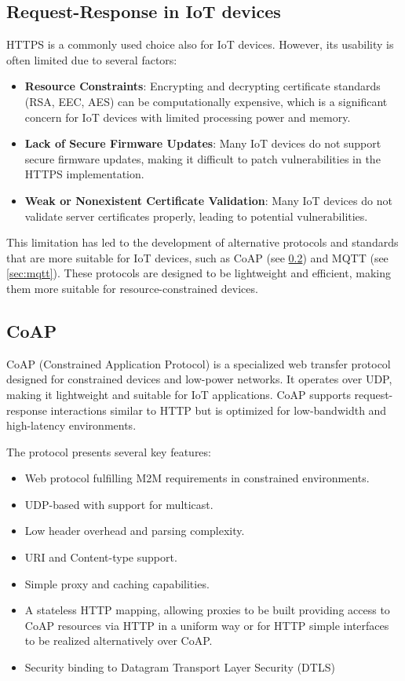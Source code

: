 \subsection{Request-Response in IoT devices}
HTTPS is a commonly used choice also for IoT devices. However, its usability is often limited due to several factors:
\begin{itemize}
    \item \textbf{Resource Constraints\cite{mazhar2023iotsecurity}}: Encrypting and decrypting certificate standards (RSA, EEC, AES) can be computationally expensive, which is a significant concern for IoT devices with limited processing power and memory.
    \item \textbf{Lack of Secure Firmware Updates\cite{cyberark2024iot}}: Many IoT devices do not support secure firmware updates, making it difficult to patch vulnerabilities in the HTTPS implementation.
    \item \textbf{Weak or Nonexistent Certificate Validation\cite{bishopfox2020weakcertificates}}: Many IoT devices do not validate server certificates properly, leading to potential vulnerabilities.
\end{itemize}

This limitation has led to the development of alternative protocols and standards that are more suitable for IoT devices, such as CoAP (see \cref{sec:coap}) and MQTT (see \cref{sec:mqtt}). These protocols are designed to be lightweight and efficient, making them more suitable for resource-constrained devices.

\subsection{CoAP} \label{sec:coap}

CoAP (Constrained Application Protocol) is a specialized web transfer protocol designed for constrained devices and low-power networks\cite{rfc7252}. It operates over UDP, making it lightweight and suitable for IoT applications. CoAP supports request-response interactions similar to HTTP but is optimized for low-bandwidth and high-latency environments.

The protocol presents several key features:
\begin{itemize}
    \item Web protocol fulfilling M2M requirements in constrained
      environments.
    \item UDP-based with support for multicast.
    \item Low header overhead and parsing complexity.
    \item URI and Content-type support.
    \item Simple proxy and caching capabilities.
    \item A stateless HTTP mapping, allowing proxies to be built providing access to CoAP resources via HTTP in a uniform way or for HTTP simple interfaces to be realized alternatively over CoAP.
    \item Security binding to Datagram Transport Layer Security (DTLS)
\end{itemize}

